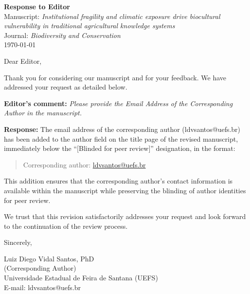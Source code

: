 \documentclass[12pt]{article}
\begin{document}
\noindent
\textbf{Response to Editor}\\[6pt]
Manuscript: \textit{Institutional fragility and climatic exposure drive biocultural vulnerability in traditional agricultural knowledge systems}\\[6pt]
Journal: \textit{Biodiversity and Conservation}\\[6pt]
\today

\vspace{24pt}

\noindent
Dear Editor,

\vspace{12pt}

\noindent
Thank you for considering our manuscript and for your feedback. We have addressed your request as detailed below.

\vspace{18pt}

\noindent
\textbf{Editor's comment:} \textit{Please provide the Email Address of the Corresponding Author in the manuscript.}

\vspace{12pt}

\noindent
\textbf{Response:} The email address of the corresponding author (ldvsantos@uefs.br) has been added to the author field on the title page of the revised manuscript, immediately below the ``[Blinded for peer review]'' designation, in the format:

\vspace{6pt}

\begin{quote}
Corresponding author: \href{mailto:ldvsantos@uefs.br}{ldvsantos@uefs.br}
\end{quote}

\vspace{6pt}

\noindent
This addition ensures that the corresponding author's contact information is available within the manuscript while preserving the blinding of author identities for peer review.

\vspace{36pt}

\noindent
We trust that this revision satisfactorily addresses your request and look forward to the continuation of the review process.

\vspace{36pt}

\noindent
Sincerely,

\vspace{36pt}

\noindent
Luiz Diego Vidal Santos, PhD\\
(Corresponding Author)\\
Universidade Estadual de Feira de Santana (UEFS)\\
E-mail: ldvsantos@uefs.br
\end{document}
